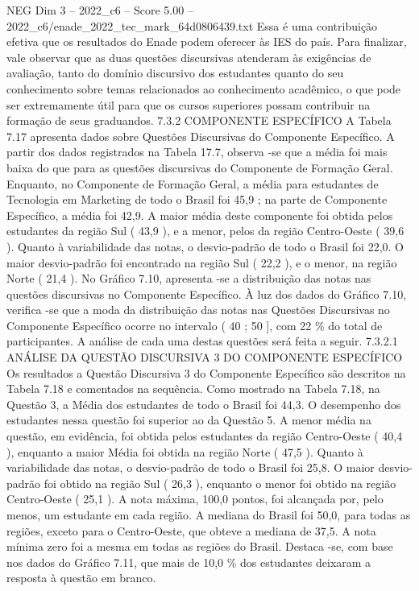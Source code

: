 \begin{textsample}{NEG Dim 3 – 2022\_c6 – Score 5.00 – 2022\_c6/enade\_2022\_tec\_mark\_64d0806439.txt}
Essa é uma contribuição efetiva que os resultados do Enade podem oferecer às IES do país.
Para finalizar, vale observar que as duas questões discursivas atenderam às exigências de avaliação, tanto do domínio discursivo dos estudantes quanto do seu conhecimento sobre temas relacionados ao conhecimento acadêmico, o que pode ser extremamente útil para que os cursos superiores possam contribuir na formação de seus graduandos. 7.3.2 COMPONENTE ESPECÍFICO A Tabela 7.17 apresenta dados sobre Questões Discursivas do Componente Específico.
A partir dos dados registrados na Tabela 17.7, observa -se que a média foi mais baixa do que para as questões discursivas do Componente de Formação Geral.
Enquanto, no Componente de Formação Geral, a média para estudantes de Tecnologia em Marketing de todo o Brasil foi 45,9 ; na parte de Componente Específico, a média foi 42,9.
A maior média deste componente foi obtida pelos estudantes da região Sul ( 43,9 ), e a menor, pelos da região Centro-Oeste ( 39,6 ).
Quanto à variabilidade das notas, o desvio-padrão de todo o Brasil foi 22,0.
O maior desvio-padrão foi encontrado na região Sul ( 22,2 ), e o menor, na região Norte ( 21,4 ).
No Gráfico 7.10, apresenta -se a distribuição das notas nas questões discursivas no Componente Específico.
À luz dos dados do Gráfico 7.10, verifica -se que a moda da distribuição das notas nas Questões Discursivas no Componente Específico ocorre no intervalo ( 40 ; 50 ], com 22 \% do total de participantes.
A análise de cada uma destas questões será feita a seguir. 7.3.2.1 ANÁLISE DA QUESTÃO DISCURSIVA 3 DO COMPONENTE ESPECÍFICO Os resultados a Questão Discursiva 3 do Componente Específico são descritos na Tabela 7.18 e comentados na sequência.
Como mostrado na Tabela 7.18, na Questão 3, a Média dos estudantes de todo o Brasil foi 44,3.
O desempenho dos estudantes nessa questão foi superior ao da Questão 5.
A menor média na questão, em evidência, foi obtida pelos estudantes da região Centro-Oeste ( 40,4 ), enquanto a maior Média foi obtida na região Norte ( 47,5 ).
Quanto à variabilidade das notas, o desvio-padrão de todo o Brasil foi 25,8.
O maior desvio-padrão foi obtido na região Sul ( 26,3 ), enquanto o menor foi obtido na região Centro-Oeste ( 25,1 ).
A nota máxima, 100,0 pontos, foi alcançada por, pelo menos, um estudante em cada região.
A mediana do Brasil foi 50,0, para todas as regiões, exceto para o Centro-Oeste, que obteve a mediana de 37,5.
A nota mínima zero foi a mesma em todas as regiões do Brasil.
Destaca -se, com base nos dados do Gráfico 7.11, que mais de 10,0 \% dos estudantes deixaram a resposta à questão em branco.

\end{textsample}
